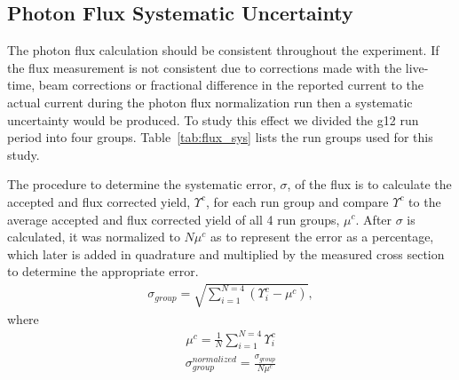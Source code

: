\subsection{Photon Flux Systematic Uncertainty}
 		The photon flux calculation should be consistent throughout the experiment. If the flux measurement is not consistent due to corrections made with the live-time, beam corrections or fractional difference in the reported current to the actual current during the photon flux normalization run then a systematic uncertainty would be produced. To study this effect we divided the g12 run period into four groups. Table~\ref{tab:flux_sys} lists the run groups used for this study.
 		
% 		
 		The procedure to determine the systematic error, $\sigma$, of the flux is to calculate the accepted and flux corrected yield, $\Upsilon^c$, for each run group and compare $\Upsilon^c$ to the average accepted and flux corrected yield of all 4 run groups, $\mu^c$. After $\sigma$ is calculated, it was normalized to $N \mu^c$ as to represent the error as a percentage, which later is added in quadrature and  multiplied by the measured cross section to determine the appropriate error. 
 		\begin{align}
 			\sigma_{group} = \sqrt{\sum_{i=1}^{N = 4}\left(\Upsilon_i^c - \mu^c\right)},
 		\end{align}
 		where
 		\begin{align}
 			\mu^c = \frac{1}{N}\sum_{i=1}^{N=4}\Upsilon_i^c
 		\end{align}
 		\begin{align}
 			\sigma_{group}^{normalized} = \frac{\sigma_{group}}{N\mu^c}
 		\end{align}
 		

 			
 			
 			
